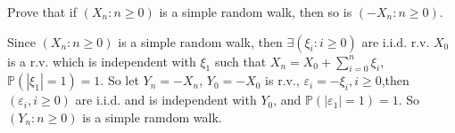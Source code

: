 \documentclass{ctexart}
\newif\ifpreface
\begin{document}
\large
\setlength{\baselineskip}{1.2em}
\ifpreface
  
\else
  \maketitle
\fi

\begin{problem}\label{pro:1}
  Prove that if \((X_n:n \geq 0)\) is a simple random walk, then so is \((-X_n:n \geq 0)\).
\end{problem}
\begin{solution}
  Since \((X_n: n \geq 0)\) is a simple random walk, then \(\exists (\xi_i: i \geq 0)\) are i.i.d.
  r.v. \(X_0\) is a r.v. which is independent with \(\xi_1\) such that
  \(X_n= X_0 + \sum_{i=0}^n \xi_i\), \(\mathbb{P}(|\xi_1|=1)=1\).
  So let \(Y_n = -X_n\), \(Y_0=-X_0\) is r.v., \(\varepsilon_i = -\xi_i, i \geq 0\),then
  \((\varepsilon_i, i \geq 0)\) are i.i.d. and is independent with \(Y_0\), and \(\mathbb{P}(|\varepsilon_1|=1)=1\).
  So \((Y_n: n \geq 0)\) is a simple ramdom walk.
\end{solution}
\end{document}
